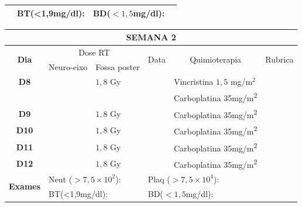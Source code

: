 \documentclass[11pt,a4paper,oldfontcommands]{memoir}
\begin{document}
\begin{center}
\begin{table}[H]
\begin{tabular}{p{1cm}p{2cm}|p{2cm}|p{1cm}|p{4cm}|p{3cm}}
    \cline{2-6}
    \multicolumn{1}{c|}{\multirow{2}{*}{{}}}&\multicolumn{2}{l|}{BT(<1,9mg/dl):}&\multicolumn{2}{l|}{BD(\(<1,5\)mg/dl):}&\\
    \hline
\end{tabular}
\end{table}
\begin{table}[H]
\begin{tabular}{p{1cm}p{2cm}|p{2cm}|p{1cm}|p{4cm}|p{3cm}}
	\hline
	\multicolumn{6}{c}{\textbf{SEMANA 2}}\\
\hline
    \multicolumn{1}{c|}{\multirow{2}{*}{\textbf{Dia}}}&\multicolumn{2}{c|}{Dose RT}&\multicolumn{1}{c|}{\multirow{2}{*}{Data}}&\multicolumn{1}{c|}{\multirow{2}{*}{Quimioterapia}}&\multicolumn{1}{c}{\multirow{2}{*}{Rubrica}} \\
    \cline{2-3}
    \multicolumn{1}{c|}{\multirow{1}{*}{}}&{Neuro-eixo}&{Fossa poster}&& \\
	\hline
	\multicolumn{1}{c|}{\multirow{1}{*}{\textbf{D8}}}&\multicolumn{1}{c|}{}&{\(1,8\) Gy}&&{Vincristina \(1,5\) mg/m\(^2\)}&\\
	\multicolumn{1}{c|}{\multirow{1}{*}{\textbf{}}}&\multicolumn{1}{c|}{}&&&{Carboplatina 35mg/m\textsuperscript{2}}&\\
    \multicolumn{1}{c|}{\multirow{1}{*}{\textbf{D9}}}&\multicolumn{1}{c|}{}&{\(1,8\) Gy}&&{Carboplatina 35mg/m\textsuperscript{2}}&\\
    \multicolumn{1}{c|}{\multirow{1}{*}{\textbf{D10}}}&\multicolumn{1}{c|}{}&{\(1,8\) Gy}&&{Carboplatina 35mg/m\textsuperscript{2}}&\\
    \multicolumn{1}{c|}{\multirow{1}{*}{\textbf{D11}}}&\multicolumn{1}{c|}{}&{\(1,8\) Gy}&&{Carboplatina 35mg/m\textsuperscript{2}}&\\
    \multicolumn{1}{c|}{\multirow{1}{*}{\textbf{D12}}}&\multicolumn{1}{c|}{}&{\(1,8\) Gy}&&{Carboplatina 35mg/m\textsuperscript{2}}&\\
    \hline
    \multicolumn{1}{c|}{\multirow{2}{*}{\textbf{Exames}}}&\multicolumn{2}{l|}{Neut (\(>7,5\times10^2\)):}&\multicolumn{2}{l|}{Plaq (\(>7,5\times10^4\)):}&\\
    \cline{2-6}
    \multicolumn{1}{c|}{\multirow{2}{*}{{}}}&\multicolumn{2}{l|}{BT(<1,9mg/dl):}&\multicolumn{2}{l|}{BD(\(<1,5\)mg/dl):}&\\
    \hline
\end{tabular}
\end{table}
\begin{table}[H]
\begin{tabular}{p{1cm}p{2cm}|p{2cm}|p{1cm}|p{4cm}|p{3cm}}

\end{tabular}
\end{table}
\end{center}
\end{document}
